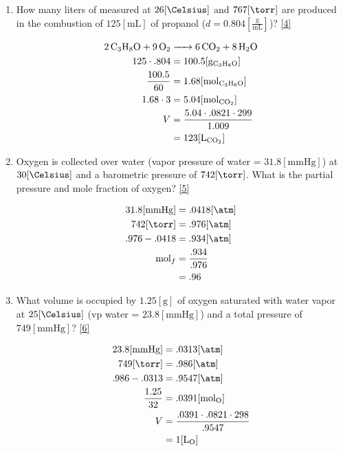 \documentclass[12pt]{article}
\begin{document}
\begin{enumerate}
  \item How many liters of  measured at $26[\si{\Celsius}]$ and $767[\si{\torr}]$ are produced in the combustion of $125[\si{\milli\liter}]$ of propanol ($d = 0.804\left[ \frac{\si{\gram}}{\si{\milli\liter}} \right]$)? \eqref{4}

      \begin{equation}
        \begin{split}
          \ce{2C3H8O + 9O2}& \ce{-> 6CO2 + 8H2O}\\
          125\cdot.804&=100.5[\si{\gram}_{\ce{C3H8O}}]\\
          \frac{100.5}{60}&=1.68[\si{\mole}_{\ce{C3H8O}}]\\
          1.68\cdot3&=5.04[\si{\mole}_{\ce{CO2}}]\\
          V&=\frac{5.04\cdot.0821\cdot299}{1.009}\\
          &=123[\si{\liter}_{\ce{CO2}}]\\
        \end{split}
        \label{4}
      \end{equation}

    \item Oxygen is collected over water (vapor pressure of water = $31.8[\si{\mmHg}]$) at $30[\si{\Celsius}]$ and a barometric pressure of $742[\si{\torr}]$.  What is the partial pressure and mole fraction of oxygen? \eqref{5}

    \begin{equation}
      \begin{split}
        31.8[\si{\mmHg}]&=.0418[\si{\atm}]\\
        742[\si{\torr}]&=.976[\si{\atm}]\\
        .976-.0418&=.934[\si{\atm}]\\
        \si{\mole}_f&=\frac{.934}{.976}\\
        &=.96
      \end{split}
      \label{5}
    \end{equation}

  \item What volume is occupied by $1.25[\si{\gram}]$ of oxygen saturated with water vapor at $25[\si{\Celsius}]$ (vp water = $23.8[\si{\mmHg}]$) and a total pressure of $749[\si{\mmHg}]$? \eqref{6}

    \begin{equation}
      \begin{split}
        23.8[\si{\mmHg}]&=.0313[\si{\atm}]\\
        749[\si{\torr}]&=.986[\si{\atm}]\\
        .986-.0313&=.9547[\si{\atm}]\\
        \frac{1.25}{32}&=.0391[\si{\mole}_{\ce{O}}]\\
        V&=\frac{.0391\cdot.0821\cdot298}{.9547}\\
        &=1[\si{\liter}_{\ce{O}}]
      \end{split}
      \label{6}
    \end{equation}


\end{enumerate}
\end{document}
